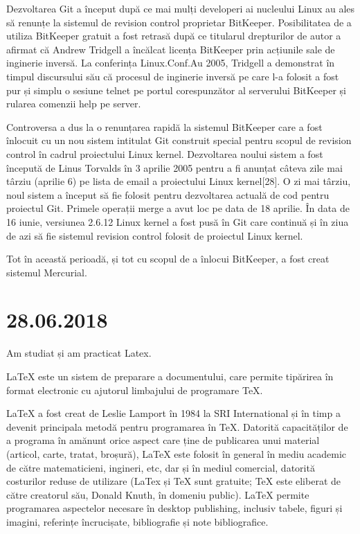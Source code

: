\documentclass{report}
\begin{document}
Dezvoltarea Git a început după ce mai mulți developeri ai nucleului Linux au ales să renunțe la sistemul de revision control proprietar BitKeeper. Posibilitatea de a utiliza BitKeeper gratuit a fost retrasă după ce titularul drepturilor de autor a afirmat că Andrew Tridgell a încălcat licența BitKeeper prin acțiunile sale de inginerie inversă. La conferința Linux.Conf.Au 2005, Tridgell a demonstrat în timpul discursului său că procesul de inginerie inversă pe care l-a folosit a fost pur și simplu o sesiune telnet pe portul corespunzător al serverului BitKeeper și rularea comenzii help pe server.

Controversa a dus la o renunțarea rapidă la sistemul BitKeeper care a fost înlocuit cu un nou sistem intitulat Git construit special pentru scopul de revision control în cadrul proiectului Linux kernel. Dezvoltarea noului sistem a fost începută de Linus Torvalds în 3 aprilie 2005 pentru a fi anunțat câteva zile mai târziu (aprilie 6) pe lista de email a proiectului Linux kernel[28]. O zi mai târziu, noul sistem a început să fie folosit pentru dezvoltarea actuală de cod pentru proiectul Git. Primele operații merge a avut loc pe data de 18 aprilie. În data de 16 iunie, versiunea 2.6.12 Linux kernel a fost pusă în Git care continuă și în ziua de azi să fie sistemul revision control folosit de proiectul Linux kernel.

Tot în această perioadă, și tot cu scopul de a înlocui BitKeeper, a fost creat sistemul Mercurial.
\newline
\chapter{28.06.2018}
Am studiat și am practicat Latex.

\item LaTeX este un sistem de preparare a documentului, care permite tipărirea în format electronic cu ajutorul limbajului de programare TeX.

LaTeX a fost creat de Leslie Lamport în 1984 la SRI International și în timp a devenit principala metodă pentru programarea în TeX. Datorită capacităților de a programa în amănunt orice aspect care ține de publicarea unui material (articol, carte, tratat, broșură), LaTeX este folosit în general în mediu academic de către matematicieni, ingineri, etc, dar și în mediul comercial, datorită costurilor reduse de utilizare (LaTex și TeX sunt gratuite; TeX este eliberat de către creatorul său, Donald Knuth, în domeniu public). LaTeX permite programarea aspectelor necesare în desktop publishing, inclusiv tabele, figuri și imagini, referințe încrucișate, bibliografie și note bibliografice.
\end{document}
